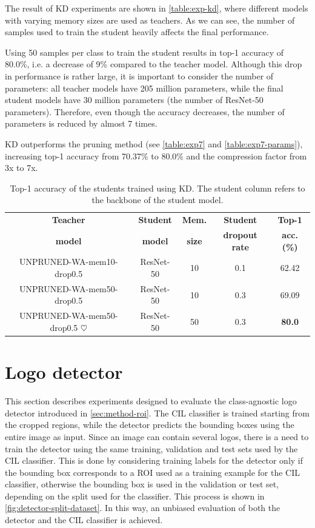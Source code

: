 The result of KD experiments are shown in \autoref{table:exp-kd}, where different models with varying memory sizes are used as teachers. As we can see, the number of samples used to train the student heavily affects the final performance.

Using 50 samples per class to train the student results in top-1 accuracy of 80.0\%, i.e. a decrease of 9\% compared to the teacher model.
Although this drop in performance is rather large, it is important to consider the number of parameters: all teacher models have 205 million parameters, while the final student models have 30 million parameters (the number of ResNet-50 parameters).
Therefore, even though the accuracy decreases, the number of parameters is reduced by almost 7 times.

KD outperforms the pruning method (see \autoref{table:exp7} and \autoref{table:exp7-params}), increasing top-1 accuracy from 70.37\% to 80.0\% and the compression factor from 3x to 7x.

\begin{table}[H]
    \centering
    \begin{tabular}{c|c|c|c|c}
        \hline
        \textbf{Teacher} &
        \textbf{Student} &
        \textbf{Mem.} &
        \textbf{Student} &
        \textbf{Top-1} \\
        \textbf{model} &
        \textbf{model} &
        \textbf{size} &
        \textbf{dropout rate} &
        \textbf{acc. (\%)} \\
        \hline
        \hline
UNPRUNED-WA-mem10-drop0.5&ResNet-50&10&0.1&62.42\\
UNPRUNED-WA-mem50-drop0.5&ResNet-50&10&0.3&69.09\\
UNPRUNED-WA-mem50-drop0.5 $\heartsuit$&ResNet-50&50&0.3&\textbf{80.0}\\
\hline
\end{tabular}
\caption{Top-1 accuracy of the students trained using KD. The student column refers to the backbone of the student model.}
    \label{table:exp-kd}
\end{table}


\section{Logo detector}
\label{sec:exp-det}
This section describes experiments designed to evaluate the class-agnostic logo detector introduced in \autoref{sec:method-roi}.
The CIL classifier is trained starting from the cropped regions, while the detector predicts the bounding boxes using the entire image as input.
Since an image can contain several logos, there is a need to train the detector using the same training, validation and test sets used by the CIL classifier.
This is done by considering training labels for the detector only if the bounding box corresponds to a ROI used as a training example for the CIL classifier, otherwise the bounding box is used in the validation or test set, depending on the split used for the classifier.
This process is shown in \autoref{fig:detector-split-dataset}.
In this way, an unbiased evaluation of both the detector and the CIL classifier is achieved.

